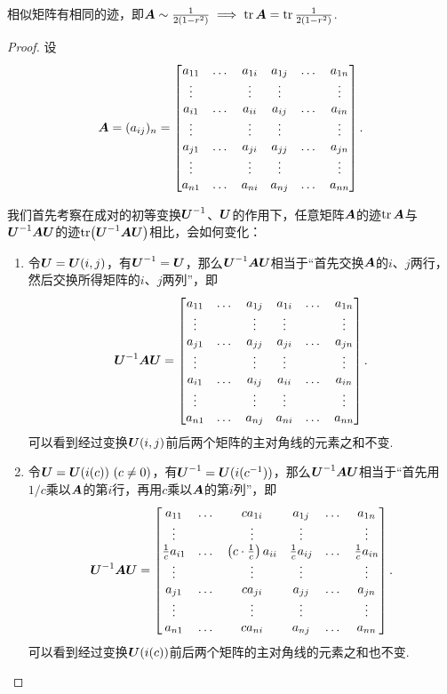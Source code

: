 \begin{property}
相似矩阵有相同的迹，即\(\boldsymbol{A}\sim\frac{1}{2(1-r^2)} \implies \tr\boldsymbol{A}=\tr\frac{1}{2(1-r^2)}\).
\begin{proof}
设\[
\boldsymbol{A} = (a_{ij})_n
= \begin{bmatrix}
a_{11} & \dots & a_{1i} & a_{1j}  & \dots & a_{1n} \\
\vdots & & \vdots & \vdots & & \vdots \\
a_{i1} & \dots & a_{ii} & a_{ij}  & \dots & a_{in} \\
\vdots & & \vdots & \vdots  & & \vdots \\
a_{j1} & \dots & a_{ji} & a_{jj}  & \dots & a_{jn} \\
\vdots & & \vdots & \vdots  & & \vdots \\
a_{n1} & \dots & a_{ni} & a_{nj}  & \dots & a_{nn}
\end{bmatrix}.
\]

我们首先考察在成对的初等变换\(\P^{-1}\)、\(\P\)的作用下，任意矩阵\(\boldsymbol{A}\)的迹\(\tr\boldsymbol{A}\)与\(\P^{-1} \A \P\)的迹\(\tr(\P^{-1} \A \P)\)相比，会如何变化：
\begin{enumerate}
\item 令\(\P = \P(i,j)\)，有\(\P^{-1} = \P\)，那么\(\P^{-1} \A \P\)相当于“首先交换\(\boldsymbol{A}\)的\(i\)、\(j\)两行，然后交换所得矩阵的\(i\)、\(j\)两列”，即\[
\P^{-1} \A \P
= \begin{bmatrix}
a_{11} & \dots & a_{1j} & a_{1i}  & \dots & a_{1n} \\
\vdots & & \vdots & \vdots & & \vdots \\
a_{j1} & \dots & a_{jj} & a_{ji}  & \dots & a_{jn} \\
\vdots & & \vdots & \vdots  & & \vdots \\
a_{i1} & \dots & a_{ij} & a_{ii}  & \dots & a_{in} \\
\vdots & & \vdots & \vdots  & & \vdots \\
a_{n1} & \dots & a_{nj} & a_{ni}  & \dots & a_{nn}
\end{bmatrix}.
\]可以看到经过变换\(\P(i,j)\)前后两个矩阵的主对角线的元素之和不变.

\item 令\(\P = \P(i(c))\ (c\neq0)\)，有\(\P^{-1} = \P(i(c^{-1}))\)，那么\(\P^{-1} \A \P\)相当于“首先用\(1/c\)乘以\(\boldsymbol{A}\)的第\(i\)行，再用\(c\)乘以\(\boldsymbol{A}\)的第\(i\)列”，即\[
\P^{-1} \A \P
= \begin{bmatrix}
a_{11} & \dots & c a_{1i} & a_{1j}  & \dots & a_{1n} \\
\vdots & & \vdots & \vdots & & \vdots \\
\frac{1}{c} a_{i1} & \dots & \left( c \cdot \frac{1}{c} \right) a_{ii} & \frac{1}{c} a_{ij}  & \dots & \frac{1}{c} a_{in} \\
\vdots & & \vdots & \vdots  & & \vdots \\
a_{j1} & \dots & c a_{ji} & a_{jj}  & \dots & a_{jn} \\
\vdots & & \vdots & \vdots  & & \vdots \\
a_{n1} & \dots & c a_{ni} & a_{nj}  & \dots & a_{nn}
\end{bmatrix}.
\]可以看到经过变换\(\P(i(c))\)前后两个矩阵的主对角线的元素之和也不变.


\end{enumerate}
\end{proof}
\end{property}
